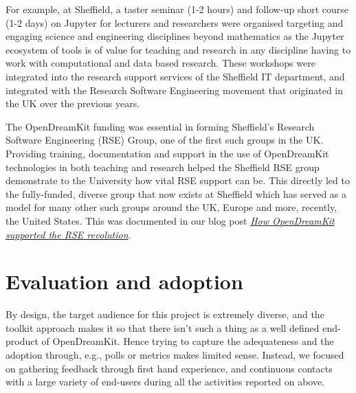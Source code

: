 \documentclass{deliverablereport}
\begin{document}
For example,
at Sheffield, a taster seminar (1-2 hours) and follow-up short course (1-2
days) on Jupyter for lecturers and researchers were organised targeting
and engaging science and engineering disciplines beyond mathematics as
the Jupyter ecosystem of tools is of value for teaching and research in
any discipline having to work with computational and data based
research. These workshops were integrated into the research support
services of the Sheffield IT department, and integrated with the
Research Software Engineering movement that originated in the UK over
the previous years.

The OpenDreamKit funding was essential in forming Sheffield's Research
Software Engineering (RSE) Group, one of the first such groups in the
UK. Providing training, documentation and support in the use of
OpenDreamKit technologies in both teaching and research helped the
Sheffield RSE group demonstrate to the University how vital RSE support
can be. This directly led to the fully-funded, diverse group that now
exists at Sheffield which has served as a model for many other such
groups around the UK, Europe and more, recently, the United States.
This was documented in our blog post
\href{https://opendreamkit.org/2018/10/29/ODK-RSE/}{\emph{How
OpenDreamKit supported the RSE revolution}}.





\section{Evaluation and adoption}

By design, the target audience for this project is extremely diverse,
and the toolkit approach makes it so that there isn't such a thing as
a well defined end-product of OpenDreamKit. Hence trying to capture
the adequateness and the adoption through, e.g., polls or metrics
makes limited sense. Instead, we focused on gathering feedback through
first hand experience, and continuous contacts with a large variety of
end-users during all the activities reported on above.
\end{document}
